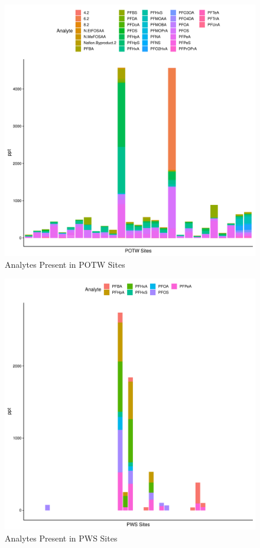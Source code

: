 \documentclass[
  12pt,
]{article}
\begin{document}
\begin{figure}

\includegraphics{PFAS_FinalProject_files/figure-latex/unnamed-chunk-13-1} \hfill{}

\caption{Analytes Present in POTW Sites}\label{fig:unnamed-chunk-13}
\end{figure}

\begin{figure}

\includegraphics{PFAS_FinalProject_files/figure-latex/unnamed-chunk-14-1} \hfill{}

\caption{Analytes Present in PWS Sites}\label{fig:unnamed-chunk-14}
\end{figure}
\end{document}
